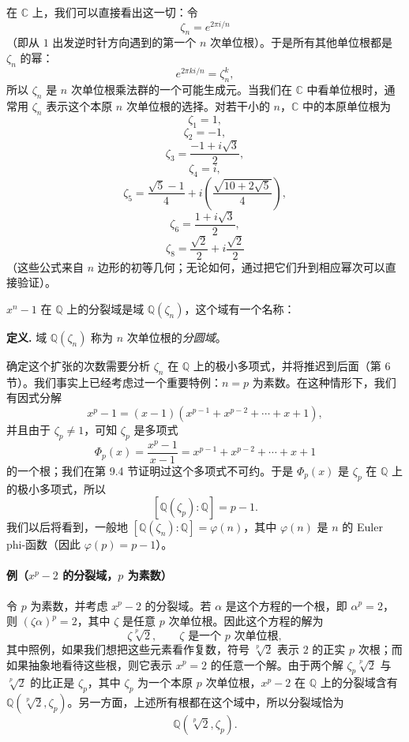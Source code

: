 	在 $\mathbb C$ 上，我们可以直接看出这一切：令
	\[
	\zeta_n=e^{2\pi i/n}
	\]
	（即从 $1$ 出发逆时针方向遇到的第一个 $n$ 次单位根）。于是所有其他单位根都是 $\zeta_n$ 的幂：
	\[
	e^{2\pi k i/n}=\zeta_n^k,
	\]
	所以 $\zeta_n$ 是 $n$ 次单位根乘法群的一个可能生成元。当我们在 $\mathbb C$ 中看单位根时，通常用 $\zeta_n$ 表示这个本原 $n$ 次单位根的选择。对若干小的 $n$，$\mathbb C$ 中的本原单位根为
	\[
	\zeta_1=1,
	\]
	\[
	\zeta_2=-1,
	\]
	\[
	\zeta_3=\frac{-1+i\sqrt3}{2},
	\]
	\[
	\zeta_4=i,
	\]
	\[
	\zeta_5=\frac{\sqrt5-1}{4}+i\left(\frac{\sqrt{10+2\sqrt5}}{4}\right),
	\]
	\[
	\zeta_6=\frac{1+i\sqrt3}{2},
	\]
	\[
	\zeta_8=\frac{\sqrt2}{2}+i\frac{\sqrt2}{2}
	\]
	（这些公式来自 $n$ 边形的初等几何；无论如何，通过把它们升到相应幂次可以直接验证）。
	
	$x^n-1$ 在 $\mathbb Q$ 上的分裂域是域 $\mathbb Q(\zeta_n)$，这个域有一个名称：
	
	\noindent\textbf{定义.} 域 $\mathbb Q(\zeta_n)$ 称为 $n$ 次单位根的\emph{分圆域}。

	
	确定这个扩张的次数需要分析 $\zeta_n$ 在 $\mathbb Q$ 上的极小多项式，并将推迟到后面（第 6 节）。我们事实上已经考虑过一个重要特例：$n=p$ 为素数。在这种情形下，我们有因式分解
	\[
	x^p-1=(x-1)(x^{p-1}+x^{p-2}+\cdots+x+1),
	\]
	并且由于 $\zeta_p\ne 1$，可知 $\zeta_p$ 是多项式
	\[
	\Phi_p(x)=\frac{x^p-1}{x-1}=x^{p-1}+x^{p-2}+\cdots+x+1
	\]
	的一个根；我们在第 9.4 节证明过这个多项式不可约。于是 $\Phi_p(x)$ 是 $\zeta_p$ 在 $\mathbb Q$ 上的极小多项式，所以
	\[
	[\mathbb Q(\zeta_p):\mathbb Q]=p-1.
	\]
	我们以后将看到，一般地 $[\mathbb Q(\zeta_n):\mathbb Q]=\varphi(n)$，其中 $\varphi(n)$ 是 $n$ 的 Euler phi-函数（因此 $\varphi(p)=p-1$）。


\paragraph{例（$x^p-2$ 的分裂域，$p$ 为素数）}
令 $p$ 为素数，并考虑 $x^p-2$ 的分裂域。若 $\alpha$ 是这个方程的一个根，即 $\alpha^p=2$，则 $(\zeta\alpha)^p=2$，其中 $\zeta$ 是任意 $p$ 次单位根。因此这个方程的解为
	\[
	\zeta\sqrt[p]{2},\qquad \zeta\text{ 是一个 }p\text{ 次单位根},
	\]
	其中照例，如果我们想把这些元素看作复数，符号 $\sqrt[p]{2}$ 表示 $2$ 的正实 $p$ 次根；而如果抽象地看待这些根，则它表示 $x^p=2$ 的任意一个解。由于两个解 $\zeta_p\sqrt[p]{2}$ 与 $\sqrt[p]{2}$ 的比正是 $\zeta_p$，其中 $\zeta_p$ 为一个本原 $p$ 次单位根，$x^p-2$ 在 $\mathbb Q$ 上的分裂域含有 $\mathbb Q(\sqrt[p]{2},\zeta_p)$。另一方面，上述所有根都在这个域中，所以分裂域恰为
	\[
	\mathbb Q(\sqrt[p]{2},\zeta_p).
	\]
	
